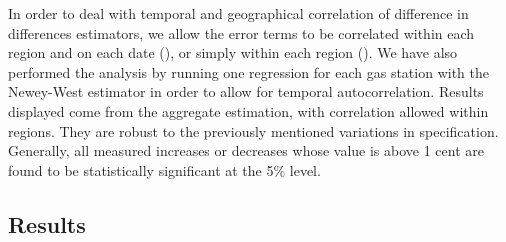 \documentclass[english]{article}
\begin{document}
In order to deal with temporal and geographical correlation of difference in differences estimators, we allow the error terms to be correlated within each region and on each date  (\cite{BER04}), or simply within each region (\cite{CAM15}). We have also performed the analysis by running one regression for each gas station with the Newey-West estimator in order to allow for temporal autocorrelation. Results displayed come from the aggregate estimation, with correlation allowed within regions. They are robust to the previously mentioned variations in specification. Generally, all measured increases or decreases whose value is above 1 cent are found to be statistically significant at the 5\% level.

\subsection{Results}
\end{document}
